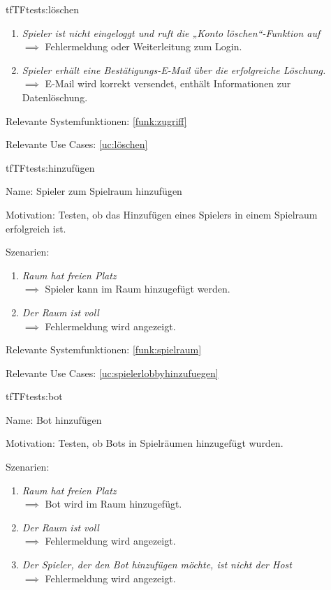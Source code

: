 \begin{description}[leftmargin=5em, style=sameline]
\begin{lhp}{tf}{TF}{tests:löschen}
\begin{enumerate}
			\item \textit{Spieler ist nicht eingeloggt und ruft die „Konto löschen“-Funktion auf} \\ $\implies$ Fehlermeldung oder Weiterleitung zum Login.
            \item \textit{Spieler erhält eine Bestätigungs-E-Mail über die erfolgreiche Löschung.} \\ $\implies$ E-Mail wird korrekt versendet, enthält Informationen zur Datenlöschung.
		\end{enumerate}
	\item [Relevante Systemfunktionen:] \ref{funk:zugriff}
	\item [Relevante Use Cases:] \ref{uc:löschen}
\end{lhp}
\begin{lhp}{tf}{TF}{tests:hinzufügen}
	\item [Name:] Spieler zum Spielraum hinzufügen
	\item [Motivation:] Testen, ob das Hinzufügen eines Spielers in einem Spielraum erfolgreich ist. 
	\item [Szenarien:] \hfill
		\begin{enumerate}
        \item \textit{Raum hat freien Platz} \\ $\implies$ Spieler kann im Raum hinzugefügt werden.
            \item \textit{Der Raum ist voll} \\ $\implies$  Fehlermeldung wird angezeigt.
		\end{enumerate}
	\item [Relevante Systemfunktionen:] \ref{funk:spielraum}
	\item [Relevante Use Cases:] \ref{uc:spielerlobbyhinzufuegen}
\end{lhp}
\begin{lhp}{tf}{TF}{tests:bot}
	\item [Name:] Bot hinzufügen
	\item [Motivation:] Testen, ob Bots in Spielräumen hinzugefügt wurden. 
	\item [Szenarien:] \hfill
		\begin{enumerate}
        \item \textit{Raum hat freien Platz} \\ $\implies$ Bot wird im Raum hinzugefügt.
            \item \textit{Der Raum ist voll} \\ $\implies$  Fehlermeldung wird angezeigt.
            \item \textit{Der Spieler, der den Bot hinzufügen möchte, ist nicht der Host} \\ $\implies$  Fehlermeldung wird angezeigt.

\end{enumerate}
\end{lhp}
\end{description}
